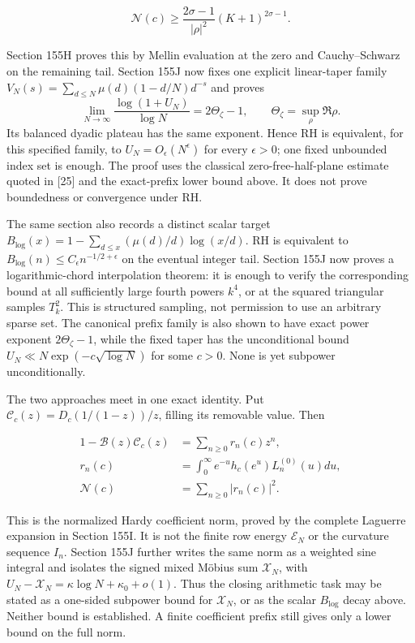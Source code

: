 \documentclass[
  11pt,
]{book}
\begin{document}
\[
\boxed{\mathscr N(c)\ge
\frac{2\sigma-1}{|\rho|^2}(K+1)^{2\sigma-1}.}
\tag{DIV.3}
\]

Section 155H proves this by Mellin evaluation at the zero and
Cauchy--Schwarz on the remaining tail. Section 155J now fixes one
explicit linear-taper family \(V_N(s)=\sum_{d\le N}\mu(d)(1-d/N)d^{-s}\)
and proves \[
\boxed{\lim_{N\to\infty}
\frac{\log(1+U_N)}{\log N}=2\Theta_\zeta-1},
\qquad \Theta_\zeta=\sup_\rho\Re\rho .
\tag{DIV.3a}
\] Its balanced dyadic plateau has the same exponent. Hence RH is
equivalent, for this specified family, to \(U_N=O_\epsilon(N^\epsilon)\)
for every \(\epsilon>0\); one fixed unbounded index set is enough. The
proof uses the classical zero-free-half-plane estimate quoted in
{[}25{]} and the exact-prefix lower bound above. It does not prove
boundedness or convergence under RH.

The same section also records a distinct scalar target
\(B_{\log}(x)=1-\sum_{d\le x}(\mu(d)/d)\log(x/d)\). RH is equivalent to
\(B_{\log}(n)\le C_\epsilon n^{-1/2+\epsilon}\) on the eventual integer
tail. Section 155J now proves a logarithmic-chord interpolation theorem:
it is enough to verify the corresponding bound at all sufficiently large
fourth powers \(k^4\), or at the squared triangular samples \(T_k^2\).
This is structured sampling, not permission to use an arbitrary sparse
set. The canonical prefix family is also shown to have exact power
exponent \(2\Theta_\zeta-1\), while the fixed taper has the
unconditional bound \(U_N\ll N\exp(-c\sqrt{\log N})\) for some \(c>0\).
None is yet subpower unconditionally.

The two approaches meet in one exact identity. Put
\(\mathcal C_c(z)=D_c(1/(1-z))/z\), filling its removable value. Then

\[
\boxed{\begin{aligned}
1-\mathcal B(z)\mathcal C_c(z)&=\sum_{n\ge0}r_n(c)z^n,\\
r_n(c)&=\int_0^\infty e^{-u}h_c(e^u)L_n^{(0)}(u)du,\\
\mathscr N(c)&=\sum_{n\ge0}|r_n(c)|^2.
\end{aligned}}
\tag{DIV.4}
\]

This is the normalized Hardy coefficient norm, proved by the complete
Laguerre expansion in Section 155I. It is not the finite row energy
\(\mathscr E_N\) or the curvature sequence \(I_n\). Section 155J further
writes the same norm as a weighted sine integral and isolates the signed
mixed Möbius sum \(\mathcal X_N\), with
\(U_N-\mathcal X_N=\kappa\log N+\kappa_0+o(1)\). Thus the closing
arithmetic task may be stated as a one-sided subpower bound for
\(\mathcal X_N\), or as the scalar \(B_{\log}\) decay above. Neither
bound is established. A finite coefficient prefix still gives only a
lower bound on the full norm.
\end{document}
